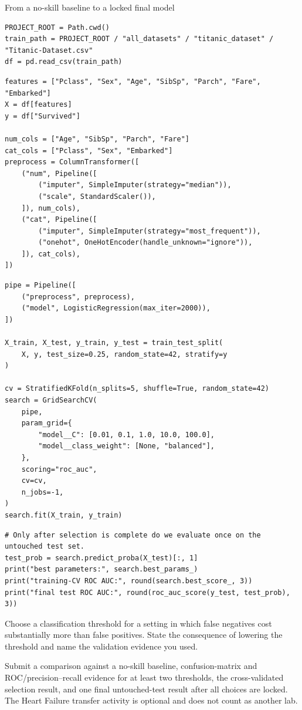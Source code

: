 \begin{labproject}{From a no-skill baseline to a locked final model}
\begin{lstlisting}[style=mlpython]
PROJECT_ROOT = Path.cwd()
train_path = PROJECT_ROOT / "all_datasets" / "titanic_dataset" / "Titanic-Dataset.csv"
df = pd.read_csv(train_path)
\end{lstlisting}

\begin{lstlisting}[style=mlpython]
features = ["Pclass", "Sex", "Age", "SibSp", "Parch", "Fare", "Embarked"]
X = df[features]
y = df["Survived"]

num_cols = ["Age", "SibSp", "Parch", "Fare"]
cat_cols = ["Pclass", "Sex", "Embarked"]
preprocess = ColumnTransformer([
    ("num", Pipeline([
        ("imputer", SimpleImputer(strategy="median")),
        ("scale", StandardScaler()),
    ]), num_cols),
    ("cat", Pipeline([
        ("imputer", SimpleImputer(strategy="most_frequent")),
        ("onehot", OneHotEncoder(handle_unknown="ignore")),
    ]), cat_cols),
])
\end{lstlisting}

\begin{lstlisting}[style=mlpython]
pipe = Pipeline([
    ("preprocess", preprocess),
    ("model", LogisticRegression(max_iter=2000)),
])

X_train, X_test, y_train, y_test = train_test_split(
    X, y, test_size=0.25, random_state=42, stratify=y
)

cv = StratifiedKFold(n_splits=5, shuffle=True, random_state=42)
search = GridSearchCV(
    pipe,
    param_grid={
        "model__C": [0.01, 0.1, 1.0, 10.0, 100.0],
        "model__class_weight": [None, "balanced"],
    },
    scoring="roc_auc",
    cv=cv,
    n_jobs=-1,
)
search.fit(X_train, y_train)
\end{lstlisting}

\begin{lstlisting}[style=mlpython]
# Only after selection is complete do we evaluate once on the untouched test set.
test_prob = search.predict_proba(X_test)[:, 1]
print("best parameters:", search.best_params_)
print("training-CV ROC AUC:", round(search.best_score_, 3))
print("final test ROC AUC:", round(roc_auc_score(y_test, test_prob), 3))
\end{lstlisting}

\begin{decisionmemo}
Choose a classification threshold for a setting in which false negatives cost substantially more than false positives. State the consequence of lowering the threshold and name the validation evidence you used.
\end{decisionmemo}
\end{labproject}

\begin{labdeliverable}
Submit a comparison against a no-skill baseline, confusion-matrix and ROC/precision--recall evidence for at least two thresholds, the cross-validated selection result, and one final untouched-test result after all choices are locked. The Heart Failure transfer activity is optional and does not count as another lab.
\end{labdeliverable}
